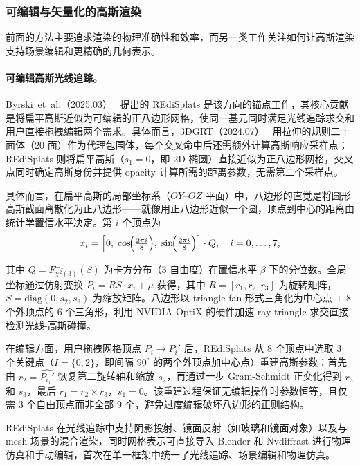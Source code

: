 \subsubsection{可编辑与矢量化的高斯渲染}

前面的方法主要追求渲染的物理准确性和效率，而另一类工作关注如何让高斯渲染支持场景编辑和更精确的几何表示。

\paragraph{可编辑高斯光线追踪。}

Byrski~et~al.（2025.03）~\cite{2503_12284} 提出的 REdiSplats 是该方向的锚点工作，其核心贡献是将扁平高斯近似为可编辑的正八边形网格，使同一基元同时满足光线追踪求交和用户直接拖拽编辑两个需求。具体而言，3DGRT（2024.07）~\cite{2407_07090} 用拉伸的规则二十面体（20 面）作为代理包围体，每个交叉命中后还需额外计算高斯响应采样点；REdiSplats 则将扁平高斯（$s_1=0$，即 2D 椭圆）直接近似为正八边形网格，交叉点同时确定高斯身份并提供 opacity 计算所需的距离参数，无需第二个采样点。

具体而言，在扁平高斯的局部坐标系（$OY$--$OZ$ 平面）中，八边形的直觉是将圆形高斯截面离散化为正八边形——就像用正八边形近似一个圆，顶点到中心的距离由统计学置信水平决定。第 $i$ 个顶点为
\begin{equation}
  x_i = \Bigl[0,\; \cos\!\Bigl(\tfrac{2\pi i}{8}\Bigr),\; \sin\!\Bigl(\tfrac{2\pi i}{8}\Bigr)\Bigr] \cdot Q, \quad i=0,\ldots,7,
\end{equation}

其中 $Q = F_{\chi^2(3)}^{-1}(\beta)$ 为卡方分布（3 自由度）在置信水平 $\beta$ 下的分位数。全局坐标通过仿射变换 $P_i = RS \cdot x_i + \mu$ 获得，其中 $R=[r_1,r_2,r_3]$ 为旋转矩阵，$S=\mathrm{diag}(0,s_2,s_3)$ 为缩放矩阵。八边形以 triangle fan 形式三角化为中心点 + 8 个外顶点的 6 个三角形，利用 NVIDIA OptiX 的硬件加速 ray-triangle 求交直接检测光线-高斯碰撞。

在编辑方面，用户拖拽网格顶点 $P_i \to P_i'$ 后，REdiSplats 从 8 个顶点中选取 3 个关键点（$I=\{0,2\}$，即间隔 $90^\circ$ 的两个外顶点加中心点）重建高斯参数：首先由 $r_2 = \widehat{P_{i_1}'}$ 恢复第二旋转轴和缩放 $s_2$，再通过一步 Gram-Schmidt 正交化得到 $r_3$ 和 $s_3$，最后 $r_1 = r_2 \times r_3$，$s_1=0$。该重建过程保证无编辑操作时参数恒等，且仅需 3 个自由顶点而非全部 9 个，避免过度编辑破坏八边形的正则结构。

REdiSplats 在光线追踪中支持阴影投射、镜面反射（如玻璃和镜面对象）以及与 mesh 场景的混合渲染，同时网格表示可直接导入 Blender 和 Nvdiffrast 进行物理仿真和手动编辑，首次在单一框架中统一了光线追踪、场景编辑和物理仿真。

